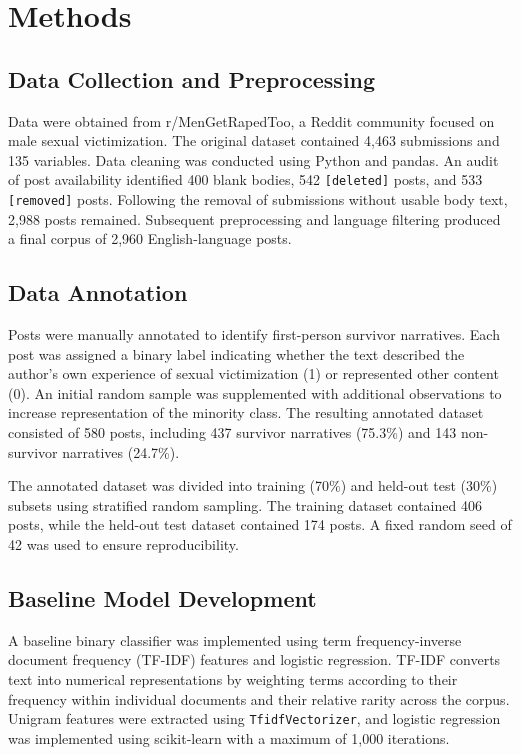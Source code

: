 \documentclass[11pt,a4paper]{article}
\begin{document}
\section{Methods}

\subsection{Data Collection and Preprocessing}

Data were obtained from r/MenGetRapedToo, a Reddit community focused on male sexual victimization. The original dataset contained 4,463 submissions and 135 variables. Data cleaning was conducted using Python and pandas. An audit of post availability identified 400 blank bodies, 542 \texttt{[deleted]} posts, and 533 \texttt{[removed]} posts. Following the removal of submissions without usable body text, 2,988 posts remained. Subsequent preprocessing and language filtering produced a final corpus of 2,960 English-language posts.

\subsection{Data Annotation}

Posts were manually annotated to identify first-person survivor narratives. Each post was assigned a binary label indicating whether the text described the author's own experience of sexual victimization (1) or represented other content (0). An initial random sample was supplemented with additional observations to increase representation of the minority class. The resulting annotated dataset consisted of 580 posts, including 437 survivor narratives (75.3\%) and 143 non-survivor narratives (24.7\%).

The annotated dataset was divided into training (70\%) and held-out test (30\%) subsets using stratified random sampling. The training dataset contained 406 posts, while the held-out test dataset contained 174 posts. A fixed random seed of 42 was used to ensure reproducibility.

\subsection{Baseline Model Development}

A baseline binary classifier was implemented using term frequency-inverse document frequency (TF-IDF) features and logistic regression. TF-IDF converts text into numerical representations by weighting terms according to their frequency within individual documents and their relative rarity across the corpus. Unigram features were extracted using \texttt{TfidfVectorizer}, and logistic regression was implemented using scikit-learn with a maximum of 1,000 iterations.
\end{document}
